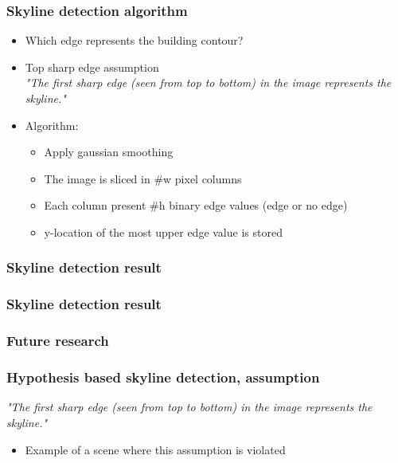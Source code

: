 \documentclass{beamer}
\begin{document}
\frame
{
	\frametitle{Skyline detection algorithm}%
	\begin{itemize}
		\item <+-| alert@+> Which edge represents the building contour?
		\item <+-| alert@+> Top sharp edge assumption\\
		\emph{"The first sharp edge (seen from top to bottom) in the image represents the skyline."}
		\item <+-| alert@+> Algorithm:
			\begin{itemize}
			\item <+-| alert@+> Apply gaussian smoothing
			\item <+-| alert@+> The image is sliced in \#w pixel columns
			\item <+-| alert@+> Each column present \#h binary edge values (edge or no edge)
			\item <+-| alert@+> y-location of the most upper edge value is stored 
			\end{itemize}
	\end{itemize}
}



\frame
{
	\frametitle{Skyline detection result}%
}

\frame
{
	\frametitle{Skyline detection result}%
}

\frame
{
	\frametitle{Future research}
}

\frame
{
	\frametitle{Hypothesis based skyline detection, assumption}
	\emph{"The first sharp edge (seen from top to bottom) in the image represents the skyline."}
	\begin{itemize}
	\item <+-| alert@+> Example of a scene where this assumption is violated
	\end{itemize}
}
\end{document}
